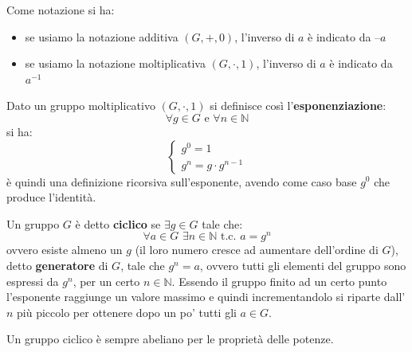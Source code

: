 \documentclass[a4paper,12pt, oneside]{book}
\begin{document}
Come notazione si ha:
\begin{itemize}
  \item se usiamo la notazione additiva $(G, +, 0)$, l'inverso di $a$ è
  indicato da $–a$  
  \item se usiamo la notazione moltiplicativa $(G, \cdot, 1)$, l'inverso di
  $a$ è indicato da $a^{-1}$ 
\end{itemize}
\begin{definizione}
  Dato un gruppo moltiplicativo $(G, \cdot, 1)$ si definisce così
  l'\textbf{esponenziazione}:
  \[\forall g\in G\mbox{ e }\forall n\in \mathbb{N}\]
  si ha:
  \[
    \begin{cases}
      g^0=1\\
      g^n=g\cdot g^{n-1}
    \end{cases}
  \]
  è quindi una definizione ricorsiva sull'esponente, avendo come caso base
  $g^0$ che produce l'identità.
\end{definizione}
\begin{definizione}
  Un gruppo $G$ è detto \textbf{ciclico} se $\exists g\in G$ tale che:
  \[\forall a \in G \,\,\exists n\in \mathbb{N}\mbox{ t.c. }a=g^n\]
  ovvero esiste almeno un $g$ (il loro numero cresce ad aumentare dell'ordine
  di $G$), detto \textbf{generatore} di $G$, tale che $g^n=a$, ovvero tutti
  gli elementi del gruppo sono espressi da $g^n$, per un certo
  $n\in\mathbb{N}$. Essendo il gruppo finito ad un certo punto l'esponente
  raggiunge un valore massimo e quindi incrementandolo si riparte dall'$n$ più
  piccolo per ottenere dopo un po' tutti gli $a\in G$.
\end{definizione}
\begin{teorema}
  Un gruppo ciclico è sempre abeliano per le proprietà delle potenze.
\end{teorema}
\end{document}
